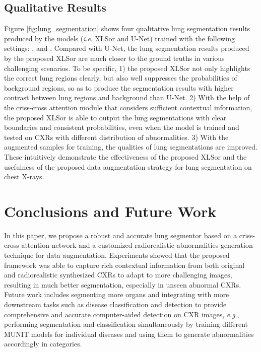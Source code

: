 \documentclass{midl} \usepackage{multirow}
\newcommand{\ie}{\textit{i}.\textit{e}. }
\newcommand{\eg}{\textit{e}.\textit{g}., }
\begin{document}
\subsection{Qualitative Results}
Figure \ref{fig:lung_segmentation} shows four qualitative lung segmentation results produced by the models (\ie XLSor and U-Net) trained with the following settings: ,  and . Compared with U-Net, the lung segmentation results produced by the proposed XLSor are much closer to the ground truths in various challenging scenarios. To be specific, 1) the proposed XLSor not only highlights the correct lung regions clearly, but also well suppresses the probabilities of background regions, so as to produce the segmentation results
with higher contrast between lung regions and background than U-Net. 2) With the help of the criss-cross attention module that considers sufficient contextual information, the proposed XLSor is able to output the lung segmentations with clear boundaries and consistent probabilities, even when the model is trained and tested on CXRs with different distribution of abnormalities. 3) With the augmented samples for training, the qualities of lung segmentations are improved. These intuitively demonstrate the effectiveness of the proposed XLSor and the usefulness of the proposed data augmentation strategy for lung segmentation on chest X-rays. 

\section{Conclusions and Future Work}
In this paper, we propose a robust and accurate lung segmentor based on a criss-cross attention network and a customized radiorealistic abnormalities generation technique for data augmentation. Experiments showed that the proposed framework was able to capture rich contextual information from both original and radiorealistic synthesized CXRs to adapt to more challenging images, resulting in much better segmentation, especially in unseen abnormal CXRs. Future work includes segmenting more organs and integrating with more downstream tasks such as disease classification and detection to provide comprehensive and accurate computer-aided detection on CXR images, \eg performing segmentation and classification simultaneously by training different MUNIT models for individual diseases and using them to generate abnormalities accordingly in categories.



\end{document}
